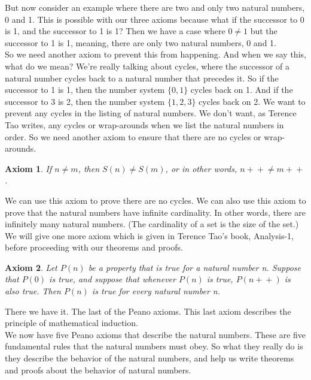 \documentclass{article}
\newtheorem{axiom}{Axiom}
\newcommand{\inc}[1]{\mathrel{{{#1}+}+}}
\begin{document}
But now consider an example where there are two and only two natural numbers, 0 and 1. This is possible with our three axioms because what if the successor to 0 is 1, and the successor to 1 is 1? Then we have a case where $0 \neq 1$ but the successor to 1 is 1, meaning, there are only two natural numbers, 0 and 1. \\

So we need another axiom to prevent this from happening. And when we say this, what do we mean? We're really talking about cycles, where the successor of a natural number cycles back to a natural number that precedes it. So if the successor to 1 is 1, then the number system $\{0, 1\}$ cycles back on 1. And if the successor to 3 is 2, then the number system $\{1, 2, 3\}$ cycles back on 2. We want to prevent any cycles in the listing of natural numbers. We don't want, as Terence Tao writes, any cycles or wrap-arounds when we list the natural numbers in order. So we need another axiom to ensure that there are no cycles or wrap-arounds.

\begin{axiom}
If $n \neq m$, then $S(n) \neq S(m)$, or in other words, $\inc{n} \neq \inc{m}$.
\end{axiom}

We can use this axiom to prove there are no cycles. We can also use this axiom to prove that the natural numbers have infinite cardinality. In other words, there are infinitely many natural numbers. (The cardinality of a set is the size of the set.) We will give one more axiom which is given in Terence Tao's book, Analysis-1, before proceeding with our theorems and proofs.

\begin{axiom}
Let $P(n)$ be a property that is true for a natural number n. Suppose that $P(0)$ is true, and suppose that whenever $P(n)$ is true, $P(\inc{n})$ is also true. Then $P(n)$ is true for every natural number n.
\end{axiom}

There we have it. The last of the Peano axioms. This last axiom describes the principle of mathematical induction. \\

We now have five Peano axioms that describe the natural numbers. These are five fundamental rules that the natural numbers must obey. So what they really do is they describe the behavior of the natural numbers, and help us write theorems and proofs about the behavior of natural numbers. \\
\end{document}

